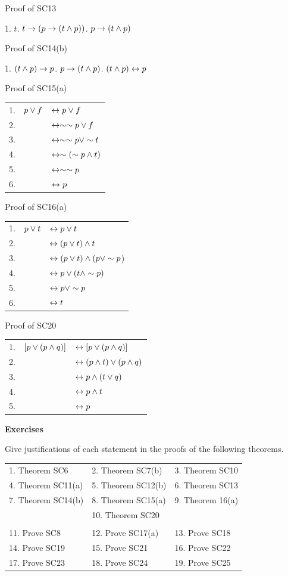\begin{large}
Proof of SC13 \nl

1.  $t$.  $t \to (p \to (t \wedge p))$.  $p \to (t \wedge p)$\nl


Proof of SC14(b) \nl

1.  $(t \wedge p) \to p$.  $p \to (t \wedge p)$.  $(t \wedge p ) \leftrightarrow p $\nl

\newpage

Proof of SC15(a)\nl
\begin{tabular}{l r l}
1.&  $p\lor f$ &$\leftrightarrow p \lor f$\\
2.&& $\leftrightarrow \sim \sim p \lor f$\\
3. && $\leftrightarrow \sim \sim p \lor \sim t$\\
4. &&$\leftrightarrow \sim (\sim p \wedge t)$\\
5. && $\leftrightarrow \sim \sim p$\\
6. && $\leftrightarrow p$\\
\end{tabular}\nl

Proof of SC16(a)\nl
\begin{tabular}{l r l}
1.& $p\lor t$ &$\leftrightarrow p \lor t$\\
2. &&$\leftrightarrow (p \lor t) \wedge t$\\
3. &&$\leftrightarrow (p \lor t) \wedge (p \lor \sim p$) \\
4. &&$\leftrightarrow p \lor (t \wedge \sim p)$\\
5. &&$\leftrightarrow p \lor \sim p$\\
6. &&$\leftrightarrow t$\\
\end{tabular}\nl

Proof of SC20 \nl
\begin{tabular}{l r l}
1.  &$[p \lor (p \wedge q)]$& $\leftrightarrow [p \lor (p \wedge q)]$ \\
2.	&&$\leftrightarrow (p \wedge t) \lor (p \wedge q)$ \\
3.  &&$\leftrightarrow p \wedge (t \lor q)$\\
4.  &&$\leftrightarrow p \wedge t$\\
5.  &&$\leftrightarrow p$\\
\end{tabular}\nl

\textbf{Exercises}\nl

Give justifications of each statement in the proofs of the following theorems.\nl

\begin{tabular}{l l l}
1. Theorem SC6& 2. Theorem SC7(b)&3. Theorem SC10\\
4. Theorem SC11(a)&5. Theorem SC12(b) &6. Theorem SC13\\
7. Theorem SC14(b)&8. Theorem SC15(a)&9. Theorem 16(a)\\
&10. Theorem SC20 &\\
&&\\
11. Prove SC8&12. Prove SC17(a)&13. Prove SC18\\
14. Prove SC19&15. Prove SC21&16. Prove SC22\\
17. Prove SC23&18. Prove SC24&19. Prove SC25\\
\end{tabular}\nl




\end{large}
